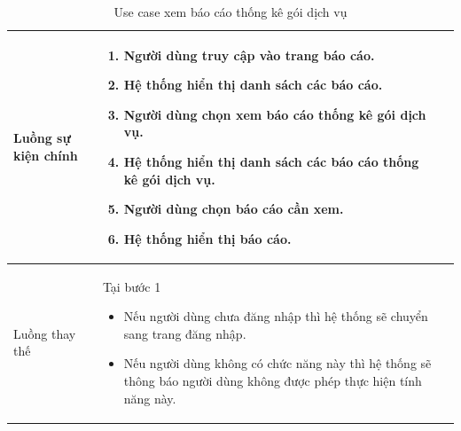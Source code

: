 \documentclass[12pt,a4paper]{article}
\begin{document}
\begin{table}[H]
\begin{tabular}{|p{3.5cm}|p{11.5cm}|c|}
            Luồng sự kiện chính & \vspace{-.8cm}\begin{enumerate}
                                                    \item Người dùng truy cập vào trang báo cáo.
                                                    \item Hệ thống hiển thị danh sách các báo cáo.
                                                    \item Người dùng chọn xem báo cáo thống kê gói dịch vụ.
                                                    \item Hệ thống hiển thị danh sách các báo cáo thống kê gói dịch vụ.
                                                    \item Người dùng chọn báo cáo cần xem.
                                                    \item Hệ thống hiển thị báo cáo.
            \end{enumerate}
            \\
            \hline
            Luồng thay thế & Tại bước 1\newline
            \vspace{-.8cm}\begin{itemize}
                              \item Nếu người dùng chưa đăng nhập thì hệ thống sẽ chuyển sang trang đăng nhập.
                              \item Nếu người dùng không có chức năng này thì hệ thống sẽ thông báo người dùng không được phép thực hiện tính năng này.
            \end{itemize}
            \\ \hline
        \end{tabular}
        \caption{Use case xem báo cáo thống kê gói dịch vụ}

    \end{table}

\end{document}
